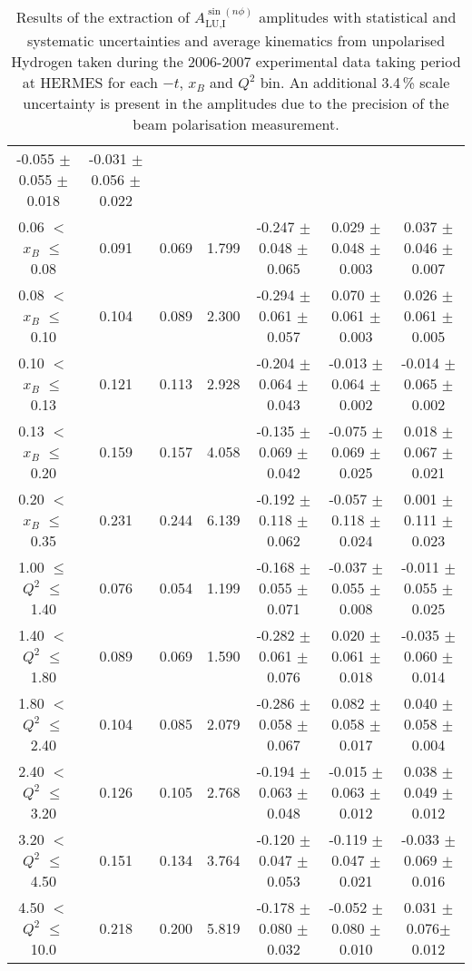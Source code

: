 \begin{table}[width=15cm]
\begin{center}
{\begin{tabular}{|c|c|c|c|c|c|c|}
-0.055 $\pm$   0.055  $\pm$   0.018 & -0.031  $\pm$  0.056  $\pm$   0.022\\
0.06 $<$ $x_{B}$ $\leqslant$ 0.08 &  0.091 & 0.069 &  1.799 &  -0.247  $\pm$  0.048  $\pm$   0.065 &
0.029 $\pm$  0.048  $\pm$   0.003 & 0.037 $\pm$   0.046  $\pm$   0.007\\
0.08 $<$ $x_{B}$ $\leqslant$ 0.10 &  0.104 & 0.089 &  2.300 &  -0.294 $\pm$  0.061  $\pm$   0.057 &
0.070 $\pm$   0.061  $\pm$   0.003 & 0.026  $\pm$  0.061  $\pm$   0.005\\
0.10 $<$ $x_{B}$ $\leqslant$ 0.13 &  0.121 &  0.113 &  2.928 &  -0.204  $\pm$  0.064   $\pm$  0.043 & 
-0.013  $\pm$  0.064  $\pm$   0.002 & -0.014  $\pm$  0.065  $\pm$   0.002\\
0.13 $<$ $x_{B}$ $\leqslant$ 0.20 &  0.159 & 0.157 &  4.058&  -0.135  $\pm$  0.069  $\pm$   0.042 &
-0.075  $\pm$  0.069  $\pm$   0.025 & 0.018  $\pm$  0.067  $\pm$   0.021 \\
0.20 $<$ $x_{B}$ $\leqslant$ 0.35 &  0.231 & 0.244 &  6.139 &  -0.192 $\pm$ 0.118  $\pm$   0.062 &
-0.057  $\pm$  0.118 $\pm$    0.024 & 0.001  $\pm$  0.111  $\pm$  0.023\\
\hline
1.00 $\leqslant$ $Q^{2}$ $\leqslant$ 1.40 &  0.076 & 0.054  & 1.199 &  -0.168  $\pm$  0.055  $\pm$   0.071 &
-0.037 $\pm$   0.055  $\pm$   0.008 & -0.011  $\pm$  0.055   $\pm$  0.025 \\
1.40 $<$ $Q^{2}$ $\leqslant$ 1.80 &  0.089 & 0.069 &  1.590 &  -0.282 $\pm$  0.061  $\pm$   0.076 &
0.020  $\pm$  0.061  $\pm$   0.018 & -0.035 $\pm$   0.060  $\pm$   0.014\\
1.80 $<$ $Q^{2}$ $\leqslant$ 2.40 &  0.104 & 0.085 &  2.079 &  -0.286 $\pm$   0.058  $\pm$   0.067 &
0.082 $\pm$   0.058  $\pm$   0.017 & 0.040  $\pm$  0.058  $\pm$   0.004\\
2.40 $<$ $Q^{2}$ $\leqslant$ 3.20 &  0.126 & 0.105  & 2.768 &  -0.194 $\pm$   0.063  $\pm$   0.048 &
-0.015  $\pm$  0.063 $\pm$    0.012 & 0.038   $\pm$ 0.049  $\pm$   0.012\\
3.20 $<$ $Q^{2}$ $\leqslant$ 4.50 &  0.151 & 0.134 &  3.764 &  -0.120 $\pm$   0.047  $\pm$   0.053 &
-0.119  $\pm$  0.047 $\pm$    0.021 & -0.033 $\pm$   0.069  $\pm$   0.016\\
4.50 $<$ $Q^{2}$ $\leqslant$ 10.0 &  0.218 & 0.200 &  5.819 &  -0.178  $\pm$  0.080 $\pm$    0.032 &
-0.052  $\pm$  0.080  $\pm$   0.010 & 0.031 $\pm$  0.076$ \pm$  0.012\\
\hline
  \end{tabular}
}
 \end{center}
\caption{Results of the extraction of $A_{\textrm{LU,I}}^{\sin(n\phi)}$  amplitudes with statistical and systematic uncertainties and average kinematics from unpolarised Hydrogen taken during
the 2006-2007 experimental data taking period at HERMES for each $-t$, $x_{B}$ and $Q^{2}$ bin.
An additional 3.4\,\% scale uncertainty is present in the amplitudes due to the precision of
the beam polarisation measurement.}
\end{table}

